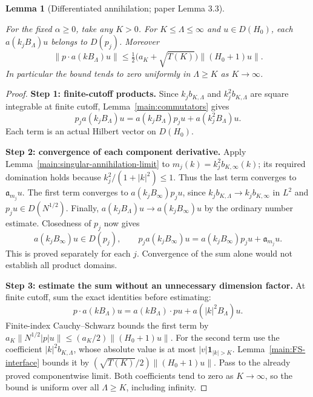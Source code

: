 \documentclass[11pt,a4paper]{article}
\newtheorem{lemma}[theorem]{Lemma}
\theoremstyle{definition}
\theoremstyle{remark}
\newcommand{\proofid}[1]{\par\smallskip{\normalfont\scriptsize\color{inkblue}Stable ID: \nolinkurl{#1}}\par\smallskip}
\begin{document}
\begin{lemma}[Differentiated annihilation; paper Lemma 3.3]
\label{main:derivative-annihilation}
\proofid{main:derivative-annihilation}
\par{}\par\smallskip

For the fixed $\alpha\geq0$, take any $K>0$. For
$K\leq\Lambda\leq\infty$ and $u\in D(H_0)$, each
$a(k_jB_\Lambda)u$ belongs to $D(p_j)$. Moreover
\[
 \|p\cdot a(kB_\Lambda)u\|
 \leq\tfrac12\bigl(a_K+\sqrt{T(K)}\bigr)\|(H_0+1)u\|.
\]
In particular the bound tends to zero uniformly in $\Lambda\geq K$
as $K\to\infty$.
\end{lemma}
\begin{proof}
\textbf{Step 1: finite-cutoff products.}
Since $k_jb_{K,\Lambda}$ and $k_j^2b_{K,\Lambda}$ are square
integrable at finite cutoff, Lemma~\ref{main:commutators} gives
\[
 p_ja(k_jB_\Lambda)u=a(k_jB_\Lambda)p_ju
                              +a(k_j^2B_\Lambda)u.
\]
Each term is an actual Hilbert vector on $D(H_0)$.

\textbf{Step 2: convergence of each component derivative.}
Apply Lemma~\ref{main:singular-annihilation-limit} to
$m_j(k)=k_j^2b_{K,\infty}(k)$; its required domination holds because
$k_j^2/(1+|k|^2)\leq1$. Thus the last term converges to
$\mathfrak a_{m_j}u$. The first term converges to
$a(k_jB_\infty)p_ju$, since $k_jb_{K,\Lambda}\to k_jb_{K,\infty}$
in $L^2$ and $p_ju\in D(N^{1/2})$. Finally,
$a(k_jB_\Lambda)u\to a(k_jB_\infty)u$ by the ordinary number
estimate. Closedness of $p_j$ now gives
\[
 a(k_jB_\infty)u\in D(p_j),\qquad
 p_ja(k_jB_\infty)u=a(k_jB_\infty)p_ju+\mathfrak a_{m_j}u.
\]
This is proved separately for each $j$. Convergence of the sum alone
would not establish all product domains.

\textbf{Step 3: estimate the sum without an unnecessary dimension factor.}
At finite cutoff, sum the exact identities before estimating:
\[
 p\cdot a(kB_\Lambda)u
       =a(kB_\Lambda)\cdot pu+a(|k|^2B_\Lambda)u.
\]
Finite-index Cauchy--Schwarz bounds the first term by
$a_K\|N^{1/2}|p|u\|\leq(a_K/2)\|(H_0+1)u\|$.
For the second term use the coefficient $|k|^2b_{K,\Lambda}$,
whose absolute value is at most $|v|\mathbf1_{|k|>K}$.
Lemma~\ref{main:FS-interface} bounds it by
$(\sqrt{T(K)}/2)\|(H_0+1)u\|$. Pass to the already proved
componentwise limit. Both coefficients tend to zero as $K\to\infty$,
so the bound is uniform over all $\Lambda\geq K$, including infinity.
\end{proof}
\end{document}
